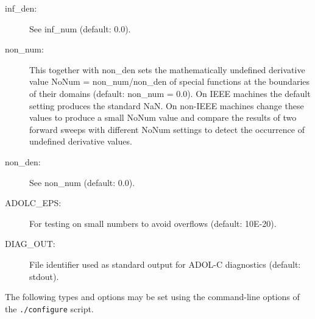 \documentclass[11pt,twoside]{article}
\begin{document}
\begin{description}
\item[{\sf inf\_den}{\rm :}] See {\sf inf\_num} (default: 0.0).

\item[{\sf non\_num}{\rm :}] This together with {\sf non\_den} 
sets the mathematically 
undefined derivative value {\sf NoNum} = {\sf non\_num/non\_den}
of special functions at the boundaries of their domains (default: {\sf non\_num} = 0.0). On IEEE machines
the default setting produces the standard {\sf NaN}. On non-IEEE machines
change these values to produce a small {\sf NoNum} value and compare
the results of two forward sweeps with different {\sf NoNum} settings
to detect the occurrence of undefined derivative values.

\item[{\sf non\_den}{\rm :}] See {\sf non\_num} (default: 0.0).

\item[{\sf ADOLC\_EPS}{\rm :}] For testing on small numbers to avoid overflows (default: 10E-20).

\item[{\sf DIAG\_OUT}{\rm :}] File identifier used as standard output for ADOL-C diagnostics (default: stdout).
\end{description}

The following types and options may be set using the command-line
options of the \texttt{./configure} script.
\end{document}
